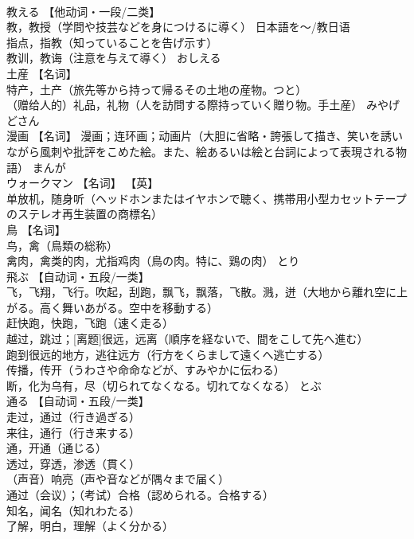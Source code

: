 \documentclass[8pt]{extreport}
\begin{document}
\begin{CJK}{UTF8}{min}
\\	教える	【他动词・一段/二类】 
\\	教，教授（学問や技芸などを身につけるに導く） 日本語を〜/教日语 
\\	指点，指教（知っていることを告げ示す） 
\\	教训，教诲（注意を与えて導く）	おしえる	
\\	土産	【名词】 
\\	特产，土产（旅先等から持って帰るその土地の産物。つと） 
\\	（赠给人的）礼品，礼物（人を訪問する際持っていく贈り物。手土産）	みやげ どさん	
\\	漫画	【名词】 漫画；连环画；动画片（大胆に省略・誇張して描き、笑いを誘いながら風刺や批評をこめた絵。また、絵あるいは絵と台詞によって表現される物語）	まんが	
\\	ウォークマン	【名词】 【英】
\\	单放机，随身听（ヘッドホンまたはイヤホンで聴く、携帯用小型カセットテープのステレオ再生装置の商標名）		
\\	鳥	【名词】 
\\	鸟，禽（鳥類の総称） 
\\	禽肉，禽类的肉，尤指鸡肉（鳥の肉。特に、鶏の肉）	とり	
\\	飛ぶ	【自动词・五段/一类】 
\\	飞，飞翔，飞行。吹起，刮跑，飘飞，飘落，飞散。溅，迸（大地から離れ空に上がる。高く舞いあがる。空中を移動する） 
\\	赶快跑，快跑，飞跑（速く走る） 
\\	越过，跳过；[离题]很远，远离（順序を経ないで、間をこして先へ進む） 
\\	跑到很远的地方，逃往远方（行方をくらまして遠くへ逃亡する） 
\\	传播，传开（うわさや命命などが、すみやかに伝わる） 
\\	断，化为乌有，尽（切られてなくなる。切れてなくなる）	とぶ	
\\	通る	【自动词・五段/一类】 
\\	走过，通过（行き過ぎる） 
\\	来往，通行（行き来する） 
\\	通，开通（通じる） 
\\	透过，穿透，渗透（貫く） 
\\	（声音）响亮（声や音などが隅々まで届く） 
\\	通过（会议）；（考试）合格（認められる。合格する） 
\\	知名，闻名（知れわたる） 
\\	了解，明白，理解（よく分かる） 

\end{CJK}
\end{document}
